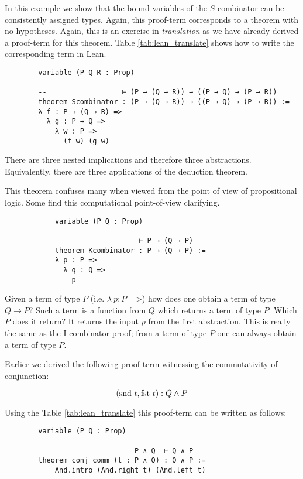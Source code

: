 \documentclass{book}
\begin{document}
    \begin{eg} [S Combinator]
        In this example we show that the bound variables of the $S$ combinator can be consistently assigned types. Again, this proof-term corresponds to a theorem with no hypotheses. Again, this is an exercise in \emph{translation} as we have already derived a proof-term for this theorem. Table \ref{tab:lean_translate} shows how to write the corresponding term in Lean. 

        \begin{lstlisting}
        variable (P Q R : Prop)

        --                  ⊢ (P → (Q → R)) → ((P → Q) → (P → R))
        theorem Scombinator : (P → (Q → R)) → ((P → Q) → (P → R)) :=
        λ f : P → (Q → R) =>
          λ g : P → Q =>
            λ w : P =>
              (f w) (g w)
        \end{lstlisting}  
        
        There are three nested implications and therefore three abstractions. Equivalently, there are three applications of the deduction theorem.      
    \end{eg}

    \begin{eg} [K Combinator]

        This theorem confuses many when viewed from the point of view of propositional logic. Some find this computational point-of-view clarifying. 

        \begin{lstlisting}
            variable (P Q : Prop)
            
            --                  ⊢ P → (Q → P)
            theorem Kcombinator : P → (Q → P) :=
            λ p : P =>
              λ q : Q =>
                p
            \end{lstlisting}  

        Given a term of type $P$ (i.e.  $\lambda \ p : P$ =>) how does one obtain a term of type $Q \to P$? Such a term is a function from $Q$ which returns a term of type $P$. Which $P$ does it return? It returns the input $p$ from the first abstraction. This is really the same as the I combinator proof; from a term of type $P$ one can always obtain a term of type $P$.
    \end{eg}

    \begin{eg} 

        Earlier we derived the following proof-term witnessing the commutativity of conjunction:

        $$ (\text{snd} \ t, \text{fst} \ t) : Q \land P $$

        Using the Table \ref{tab:lean_translate} this proof-term can be written as follows:

        \begin{lstlisting}
        variable (P Q : Prop)

        --                     P ∧ Q  ⊢ Q ∧ P
        theorem conj_comm (t : P ∧ Q) : Q ∧ P :=
            And.intro (And.right t) (And.left t)
        \end{lstlisting}        
    \end{eg}
\end{document}
